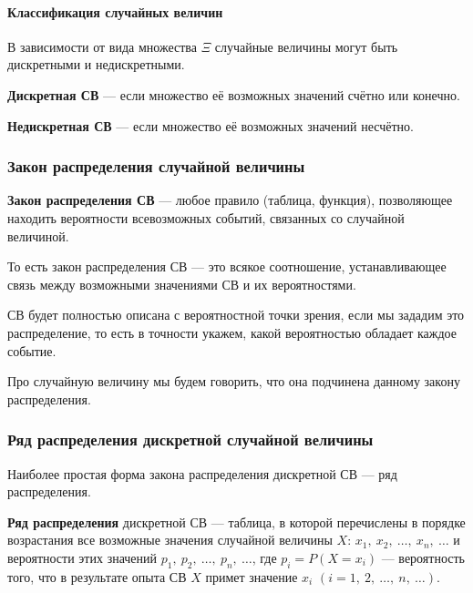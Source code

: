 \documentclass[a4paper]{article}
\newcommand{\key}[1]{{\bfseries\color{Medium} #1}}
\begin{document}
                \paragraph{Классификация случайных величин}

                    В зависимости от вида множества $\Xi$ случайные величины могут быть дискретными и недискретными.
                    
                    \key{Дискретная СВ} --- если множество её возможных значений счётно или конечно.

                    \key{Недискретная СВ} --- если множество её возможных значений несчётно.

            \subsubsection{Закон распределения случайной величины}

                \key{Закон распределения СВ} --- любое правило (таблица, функция), позволяющее находить вероятности всевозможных событий, связанных со случайной величиной.
                
                То есть закон распределения СВ --- это всякое соотношение, устанавливающее связь между возможными значениями СВ и их вероятностями.
                
                СВ будет полностью описана с вероятностной точки зрения, если мы зададим это распределение, то есть в точности укажем, какой вероятностью обладает каждое событие.
                
                Про случайную величину мы будем говорить, что она подчинена данному закону распределения.

            \subsubsection{Ряд распределения дискретной случайной величины}

                Наиболее простая форма закона распределения дискретной СВ --- ряд распределения.
                
                \key{Ряд распределения} дискретной СВ --- таблица, в которой перечислены в порядке возрастания все возможные значения случайной величины $X$: $x_1 , \: x_2 , \: \ldots , \: x_n , \: \ldots$ и вероятности этих значений $p_1 , \: p_2 , \: \ldots , \: p_n , \: \ldots$, где $p_i = P(X = x_i)$ --- вероятность того, что в результате опыта СВ $X$ примет значение $x_i$ \:$(i = 1 , \: 2 , \: \ldots , \: n , \: \ldots)$.
\end{document}
